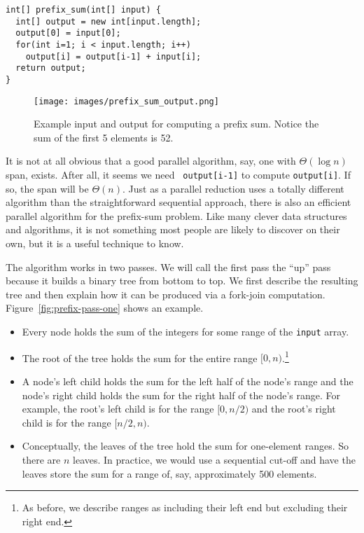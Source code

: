 \documentclass[10pt]{article}
\begin{document}
\begin{verbatim}
int[] prefix_sum(int[] input) {
  int[] output = new int[input.length];
  output[0] = input[0];
  for(int i=1; i < input.length; i++)
    output[i] = output[i-1] + input[i];
  return output;
}
\end{verbatim}

\begin{figure}
\begin{center}
\texttt{[image: images/prefix\_sum\_output.png]}
\end{center}
\caption{Example input and output for computing a prefix sum.  Notice
  the sum of the first 5 elements is 52.}
\label{fig:prefix_sum_output}
\end{figure}


It is not at all obvious that a good parallel algorithm, say, one with
$\Theta(\log n)$ span, exists.  After all, it seems we need {\tt
  output[i-1]} to compute {\tt output[i]}.  If so, the span will be
$\Theta(n)$.  Just as a parallel reduction uses a totally different
algorithm than the straightforward sequential approach, there is also
an efficient parallel algorithm for the prefix-sum problem.  Like many
clever data structures and algorithms, it is not something most people
are likely to discover on their own, but it is a useful technique
to know.

The algorithm works in two passes.  We will call the first pass the
``up'' pass because it builds a binary tree from bottom to top.  We
first describe the resulting tree and then explain how it can be
produced via a fork-join computation.
Figure~\ref{fig:prefix-pass-one} shows an example.
\begin{itemize}
\item Every node holds the sum of the integers for some range of the
  {\tt input} array.
\item The root of the tree holds the sum for the entire range 
  $[0,n)$.\footnote{As before, we describe ranges as including their left
  end but excluding their right end.}
\item A node's left child holds the sum for the left half of the
  node's range and the node's right child holds the sum for the right
  half of the node's range.  For example, the root's left child is for
  the range $[0,n/2)$ and the root's right child is for the range
  $[n/2,n)$.
\item Conceptually, the leaves of the tree hold the sum for
  one-element ranges.  So there are $n$ leaves.  In practice, we would
  use a sequential cut-off and have the leaves store the sum for a
  range of, say, approximately 500 elements.
\end{itemize}
\end{document}
